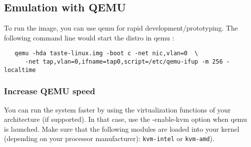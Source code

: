 \documentclass[11pt]{book}
\begin{document}
      \subsection{Emulation with QEMU}
      To run the image, you can use qemu for rapid
      development/prototyping.
      The following command line would start the distro in qemu :
      \begin{verbatim}
   qemu -hda taste-linux.img -boot c -net nic,vlan=0  \
      -net tap,vlan=0,ifname=tap0,script=/etc/qemu-ifup -m 256 -localtime
      \end{verbatim}

         \subsubsection{Increase QEMU speed} 
         You can run the system faster by using the virtualization
         functions of your architecture (if supported). In that case,
         use the -enable-kvm option when qemu is launched.
         Make sure that the following modules are loaded into your kernel
         (depending on your processor manufacturer): \texttt{kvm-intel} or
         \texttt{kvm-amd}).
\end{document}
